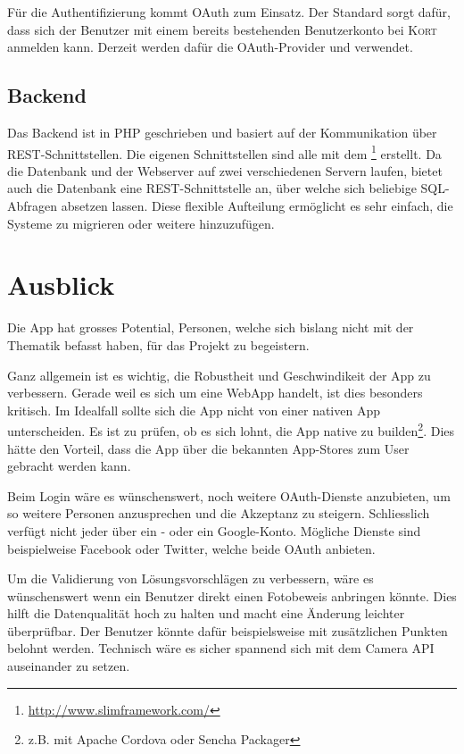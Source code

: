 Für die Authentifizierung kommt \gls{OAuth} zum Einsatz.
Der Standard sorgt dafür, dass sich der Benutzer mit einem bereits bestehenden Benutzerkonto bei \textsc{Kort} anmelden kann.
Derzeit werden dafür die \gls{OAuth}-Provider  und  verwendet.

\subsection*{Backend}
Das Backend ist in PHP geschrieben und basiert auf der Kommunikation über \gls{REST}-Schnittstellen.
Die eigenen Schnittstellen sind alle mit dem \footnote{\url{http://www.slimframework.com/}} erstellt.
Da die Datenbank und der Webserver auf zwei verschiedenen Servern laufen, bietet auch die Datenbank eine \gls{REST}-Schnittstelle an, über welche sich beliebige SQL-Abfragen absetzen lassen.
Diese flexible Aufteilung ermöglicht es sehr einfach, die Systeme zu migrieren oder weitere hinzuzufügen.

\section*{Ausblick}
Die App hat grosses Potential, Personen, welche sich bislang nicht mit der Thematik  befasst haben, für das Projekt zu begeistern.

Ganz allgemein ist es wichtig, die Robustheit und Geschwindikeit der App zu verbessern. 
Gerade weil es sich um eine \gls{WebApp} handelt, ist dies besonders kritisch. 
Im Idealfall sollte sich die App nicht von einer nativen App unterscheiden.
Es ist zu prüfen, ob es sich lohnt, die App native zu builden\footnote{z.B. mit Apache Cordova oder Sencha Packager}.
Dies hätte den Vorteil, dass die App über die bekannten \glspl{App-Store} zum User gebracht werden kann.

Beim Login wäre es wünschenswert, noch weitere \gls{OAuth}-Dienste anzubieten, um so weitere Personen anzusprechen und die Akzeptanz zu steigern.
Schliesslich verfügt nicht jeder über ein - oder ein Google-Konto.
Mögliche Dienste sind beispielweise Facebook oder Twitter, welche beide \gls{OAuth} anbieten.

Um die Validierung von Lösungsvorschlägen zu verbessern, wäre es wünschenswert wenn ein Benutzer direkt einen Fotobeweis anbringen könnte.
Dies hilft die Datenqualität hoch zu halten und macht eine Änderung leichter überprüfbar.
Der Benutzer könnte dafür beispielsweise mit zusätzlichen Punkten belohnt werden.
Technisch wäre es sicher spannend sich mit dem \gls{Camera API} auseinander zu setzen.


